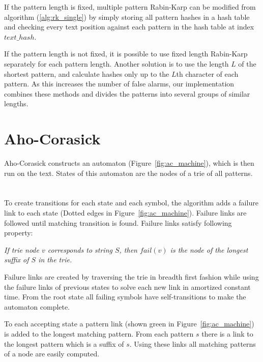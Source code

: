 \documentclass[final]{beamer}
\begin{document}
\begin{poster}
If the pattern length is fixed, multiple pattern Rabin-Karp can be modified from algorithm (\ref{alg:rk_single}) by simply storing all pattern hashes in a hash table and checking every text position against each pattern in the hash table at index $text\_hash$.

If the pattern length is not fixed, it is possible to use fixed length Rabin-Karp separately for each pattern length. Another solution is to use the length $L$ of the shortest pattern, and calculate hashes only up to the $L$th character of each pattern. As this increases the number of false alarms, our implementation combines these methods and divides the patterns into several groups of similar lengths.


\section{Aho-Corasick}

Aho-Corasick constructs an automaton (Figure~\ref{fig:ac_machine}), which is then run on the text.
States of this automaton are the nodes of a trie of all patterns.
\newcolumn
\section{}
\vspace{-19mm}
To create transitions for each state and each symbol, the algorithm adds a failure link to each state
(Dotted edges in Figure~\ref{fig:ac_machine}).
Failure links are followed until matching transition is found.
Failure links satisfy following property:

\begin{shaded}
\textit{
If trie node $v$ corresponds to string $S$, then
$fail(v)$ is the node of the longest suffix of $S$ in the trie.
}
\end{shaded}


Failure links are created by traversing the trie in breadth first fashion
while using the failure links of previous states to solve each new
link in amortized constant time.
From the root state all failing symbols have self-transitions to make the automaton complete.

To each accepting state a pattern link (shown green in Figure~\ref{fig:ac_machine})
is added to the longest matching pattern.
From each pattern $s$ there is a link to the longest pattern which
is a suffix of $s$.
Using these links all matching patterns of a node are easily
computed.


\end{poster}
\end{document}
